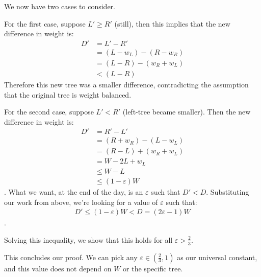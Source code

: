 \documentclass[12pt]{exam}
\begin{document}
\begin{questions}
\begin{parts}
\begin{solution}
We now have two cases to consider.

For the first case, suppose $L' \geq R'$ (still), then this implies that the new difference in weight is:
\begin{align*}
  D' &= L' - R' \\
  &= (L - w_L) - (R - w_R) \\
  &= (L - R) - (w_R + w_L) \\
  &< (L-R) \tag{$w_R + w_L > 0$}
\end{align*}
Therefore this new tree was a smaller difference, contradicting the assumption that the original tree is weight balanced.

For the second case, suppose $L' < R'$ (left-tree became smaller). Then the new difference in weight is:
\begin{align*}
  D' &= R' - L' \\
  &= (R + w_R) - (L - w_L) \\
  &= (R - L) + (w_R + w_L) \\
  &= W - 2L + w_L \tag{Substitute $w_R = W - (L + R)$} \\
  &\leq W - L \tag{$w_L \leq L$ since it came from the left subtree} \\
  &\leq (1 - \varepsilon) W \tag{$L \geq \varepsilon W$ by our assumptions}
\end{align*}.
What we want, at the end of the day, is an $\varepsilon$ such that $D' < D$.  Substituting our work from above, we're looking for a value of $\varepsilon$ such that:
\begin{align*}
  D' \leq (1 - \varepsilon)W < D = (2 \varepsilon - 1) W
\end{align*}.

Solving this inequality, we show that this holds for all $\varepsilon > \frac{2}{3}$.

This concludes our proof. We can pick any $\varepsilon \in (\frac{2}{3}, 1)$ as our universal constant, and this value does not depend on $W$ or the specific tree.

\end{solution}




\end{parts}
\end{questions}
\end{document}
